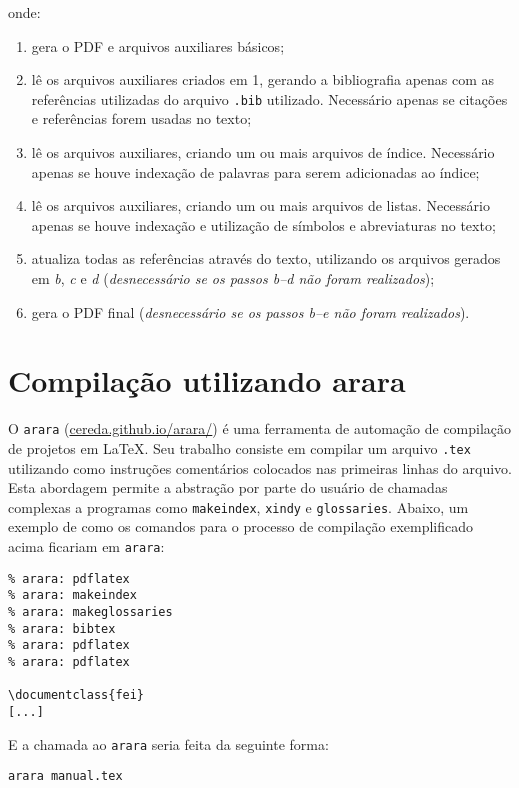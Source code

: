\documentclass{fei}
\begin{document}
	onde:
	
	\begin{enumerate}
	\item gera o PDF e arquivos auxiliares básicos;
	\item lê os arquivos auxiliares criados em 1, gerando a bibliografia apenas com as referências utilizadas do arquivo \verb+.bib+ utilizado. Necessário apenas se citações e referências forem usadas no texto;
	\item lê os arquivos auxiliares, criando um ou mais arquivos de índice. Necessário apenas se houve indexação de palavras para serem adicionadas ao índice;
	\item lê os arquivos auxiliares, criando um ou mais arquivos de listas. Necessário apenas se houve indexação e utilização de símbolos e abreviaturas no texto;
	\item atualiza todas as referências através do texto, utilizando os arquivos gerados em \emph{b}, \emph{c} e \emph{d} (\emph{desnecessário se os passos b--d não foram realizados});
	\item gera o PDF final (\emph{desnecessário se os passos b--e não foram realizados}).
	\end{enumerate}
	
	\section{Compilação utilizando arara}
	
	O \texttt{arara} (\url{cereda.github.io/arara/}) é uma ferramenta de automação de compilação de projetos em \LaTeX. Seu trabalho consiste em compilar um arquivo \texttt{.tex} utilizando como instruções comentários colocados nas primeiras linhas do arquivo. Esta abordagem permite a abstração por parte do usuário de chamadas complexas a programas como \texttt{makeindex}, \texttt{xindy} e \texttt{glossaries}. Abaixo, um exemplo de como os comandos para o processo de compilação exemplificado acima ficariam em \texttt{arara}:
	
	\begin{verbatim}
% arara: pdflatex
% arara: makeindex
% arara: makeglossaries
% arara: bibtex
% arara: pdflatex
% arara: pdflatex

\documentclass{fei}
[...]
	\end{verbatim}
	
	E a chamada ao \texttt{arara} seria feita da seguinte forma:
	
	\texttt{arara manual.tex}
	
\end{document}
